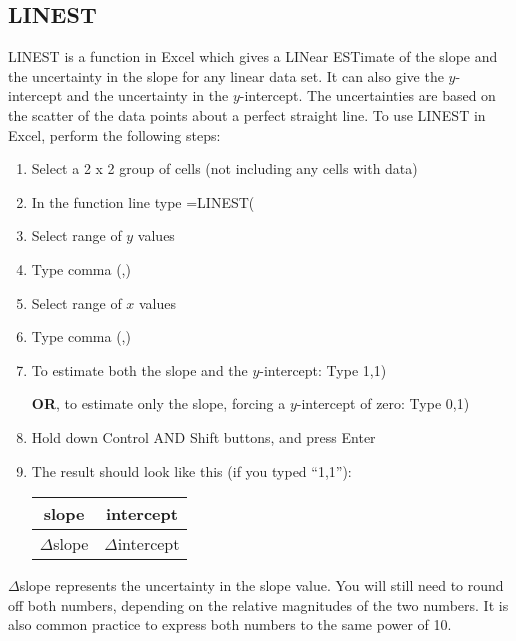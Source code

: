 \newpage

\subsection{LINEST}

LINEST is a function in Excel which gives a LINear ESTimate of the slope and the uncertainty in the slope for any linear data set. It can also give the $y$-intercept and the uncertainty in the $y$-intercept.  The uncertainties are based on the scatter of the data points about a perfect straight line. To use LINEST in Excel, perform the following steps:

\begin{enumerate}

\item Select a 2 x 2 group of cells (not including any cells with data)
\item In the function line type =LINEST(
\item Select range of $y$ values
\item Type comma (,)
\item Select range of $x$ values
\item Type comma (,)
\item To estimate both the slope and the $y$-intercept: Type 1,1)

\textbf{OR}, to estimate only the slope, forcing a $y$-intercept of zero: Type 0,1)
\item Hold down Control AND Shift buttons, and press Enter
\item The result should look like this (if you typed ``1,1''):

\begin{center} \begin{tabular}{|c|c|} \hline slope & intercept \\ \hline \( \Delta \)slope & \( \Delta \)intercept \\ \hline \end{tabular} \end{center}

\end{enumerate}

\( \Delta \)slope represents the uncertainty in the slope value. You will still need to round off both numbers, depending on the relative magnitudes of the two numbers. It is also common practice to express both numbers to the same power of 10.

